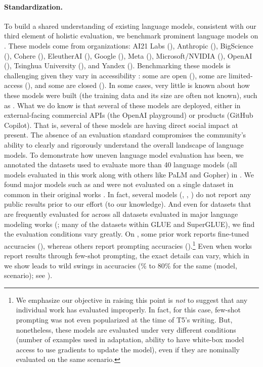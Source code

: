 \paragraph{Standardization.}
To build a shared understanding of existing language models, consistent with our third element of holistic evaluation, we benchmark \nummodels prominent language models on \benchmarkname.
These models come from \nummodelcreators organizations: AI21 Labs (\eg \jurassicjumbo), Anthropic (\anthropic), BigScience (\eg \bloom), Cohere (\eg \coherexl), EleutherAI (\eg \gptneox), Google (\eg \ultwo), Meta (\eg \optonesevenfive), Microsoft/NVIDIA (\eg \mtnlgfivethreezero), OpenAI (\eg \gptdavinci), Tsinghua University (\glm), and Yandex (\yalm). 
Benchmarking these models is challenging given they vary in  accessibility \citep[see][]{liang2022community-norms}: some are open (\eg \gptneox), some are limited-access (\eg \gptdavinci), and some are closed (\eg \anthropic).
In some cases, very little is known about how these models were built (\eg the training data and its size are often not known), such as \instructdavinci. 
What we do know is that several of these models are deployed, either in external-facing commercial APIs (\eg the OpenAI playground) or products (\eg GitHub Copilot). 
That is, several of these models are having direct social impact at present. 
The absence of an evaluation standard compromises the community's ability to clearly and rigorously understand the overall landscape of language models.
To demonstrate how uneven language model evaluation has been, we annotated the datasets used to evaluate more than 40 language models (\ie all models evaluated in this work along with others like PaLM and Gopher) in .
We found major models such as \tfive and \anthropic were not evaluated on a single dataset in common in their original works \citep{raffel2019exploring, askell2021general}.
In fact, several models (\eg \jurassicgrande, \coherexl, \yalm) do not report any public results prior to our effort (to our knowledge).
And even for datasets that are frequently evaluated for across all \numlmdatasets datasets evaluated in major language modeling works (\eg \hellaswag; many of the datasets within GLUE and SuperGLUE), we find the evaluation conditions vary greatly.
On \hellaswag, some prior work reports fine-tuned accuracies (\eg \tfive), whereas others report prompting accuracies (\eg \gptdavinci).\footnote{
We emphasize our objective in raising this point is \textit{not} to suggest that any individual work has evaluated improperly. 
In fact, for this case, few-shot prompting was not even popularized at the time of T5's writing. 
But, nonetheless, these models are evaluated under very different conditions (\eg number of examples used in adaptation, ability to have white-box model access to use gradients to update the model), even if they are nominally evaluated on the same scenario.}
Even when works report results through few-shot prompting, the exact details can vary, which in  we show leads to wild swings in accuracies (\% to 80\% for the same (model, scenario); see \citet{zhao2021calibrate}). 

